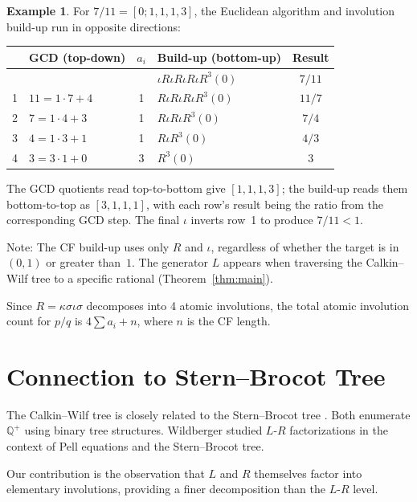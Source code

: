 \documentclass[11pt]{article}
\theoremstyle{plain}
\theoremstyle{definition}
\newtheorem{example}[theorem]{Example}
\theoremstyle{remark}
\begin{document}
\begin{example}
For $7/11 = [0; 1, 1, 1, 3]$, the Euclidean algorithm and involution build-up
run in opposite directions:

\begin{center}
\small
\begin{tabular}{clclc}
\toprule
& GCD (top-down) & $a_i$ & Build-up (bottom-up) & Result \\
\midrule
& & & $\iota R \iota R \iota R \iota R^3(0)$ & $7/11$ \\
\midrule
1 & $11 = 1 \cdot 7 + 4$ & 1 & $R \iota R \iota R \iota R^3(0)$ & $11/7$ \\
2 & $7 = 1 \cdot 4 + 3$ & 1 & $R \iota R \iota R^3(0)$ & $7/4$ \\
3 & $4 = 1 \cdot 3 + 1$ & 1 & $R \iota R^3(0)$ & $4/3$ \\
4 & $3 = 3 \cdot 1 + 0$ & 3 & $R^3(0)$ & $3$ \\
\bottomrule
\end{tabular}
\end{center}

The GCD quotients read top-to-bottom give $[1,1,1,3]$; the build-up reads
them bottom-to-top as $[3,1,1,1]$, with each row's result being the ratio
from the corresponding GCD step. The final $\iota$ inverts row~1 to produce $7/11 < 1$.

Note: The CF build-up uses only $R$ and $\iota$, regardless of whether the
target is in $(0,1)$ or greater than~$1$. The generator $L$ appears when
traversing the Calkin--Wilf tree to a specific rational (Theorem~\ref{thm:main}).
\end{example}

Since $R = \kappa\sigma\iota\sigma$ decomposes into 4 atomic involutions,
the total atomic involution count for $p/q$ is $4 \sum a_i + n$,
where $n$ is the CF length.

\section{Connection to Stern--Brocot Tree}

The Calkin--Wilf tree is closely related to the Stern--Brocot tree \cite{GrahamKnuthPatashnik1994}.
Both enumerate $\mathbb{Q}^+$ using binary tree structures. Wildberger \cite{Wildberger2010}
studied $L$-$R$ factorizations in the context of Pell equations and the Stern--Brocot tree.

Our contribution is the observation that $L$ and $R$ themselves factor into
elementary involutions, providing a finer decomposition than the $L$-$R$ level.
\end{document}
